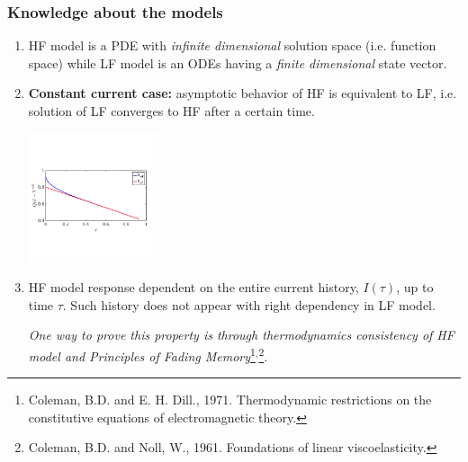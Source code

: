\documentclass[10pt,xcolor=dvipsnames,compress]{beamer}
\begin{document}
\begin{frame}
\frametitle{Knowledge about the models}
\vfill


\begin{problock}{}
\begin{enumerate}

\item HF model is a PDE with \textit{infinite dimensional} solution space (i.e. function space) while  
LF model is an ODEs having a \textit{finite dimensional} state vector. 


\item \textbf{Constant current case:} asymptotic behavior of HF is equivalent to LF, i.e. solution of LF converges to HF after a certain time.
\begin{center}
    \includegraphics[trim = 0.in 2.4in 0.in 2.8in, clip, width=0.3\textwidth]{figs/Iconst_V_hf_lf.png} 

\end{center}

\item HF model response dependent on the entire current history, $I(\tau)$, up to time $\tau$. Such history does not appear with right dependency in LF model.

\textit{One way to prove this property is through thermodynamics consistency of HF model and Principles of Fading Memory}\footnote{
Coleman, B.D. and E. H. Dill., 1971. Thermodynamic restrictions on the constitutive equations of electromagnetic theory.}$^,$\footnote{
Coleman, B.D. and Noll, W., 1961. Foundations of linear viscoelasticity.}. 
 

\end{enumerate}
\end{problock}


\vfill
\end{frame}
\end{document}
